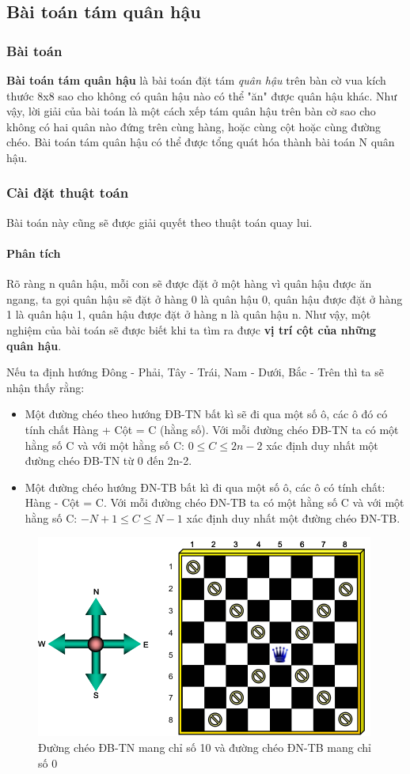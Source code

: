 \documentclass[a4paper,12pt]{report}
\begin{document}
\subsection{Bài toán tám quân hậu}

\subsubsection{Bài toán}
\textbf{Bài toán tám quân hậu} là bài toán đặt tám \emph{quân hậu} trên bàn cờ vua kích thước 8x8 sao cho không có quân hậu nào có thể "ăn" được quân hậu khác. Như vậy, lời giải của bài toán là một cách xếp tám quân hậu trên bàn cờ sao cho không có hai quân nào đứng trên cùng hàng, hoặc cùng cột hoặc cùng đường chéo. Bài toán tám quân hậu có thể được tổng quát hóa thành bài toán N quân hậu.

\subsubsection{Cài đặt thuật toán}
Bài toán này cũng sẽ được giải quyết theo thuật toán quay lui. 


\paragraph{Phân tích}
Rõ ràng n quân hậu, mỗi con sẽ được đặt ở một hàng vì quân hậu được ăn ngang, ta gọi quân hậu sẽ đặt ở hàng 0 là quân hậu 0, quân hậu được đặt ở hàng 1 là quân hậu 1, quân hậu được đặt ở hàng n là quân hậu n. Như vậy, một nghiệm của bài toán sẽ được biết khi ta tìm ra được \textbf{vị trí cột của những quân hậu}.

Nếu ta định hướng Đông - Phải, Tây - Trái, Nam - Dưới, Bắc - Trên thì ta sẽ nhận thấy rằng:
\begin{itemize}
\item Một đường chéo theo hướng ĐB-TN bất kì sẽ đi qua một số ô, các ô đó có tính chất Hàng + Cột = C (hằng số). Với mỗi đường chéo ĐB-TN ta có một hằng số C và với một hằng số C: $0 \le C \le 2n-2$ xác định duy nhất một đường chéo ĐB-TN từ 0 đến 2n-2.
\item Một đường chéo hướng ĐN-TB bất kì đi qua một số ô, các ô có tính chất: Hàng - Cột = C. Với mỗi đường chéo ĐN-TB ta có một hằng số C và với một hằng số C: $-N+1 \le C \le N-1$ xác định duy nhất một đường chéo ĐN-TB.
\end{itemize}
\begin{figure}[htp]
\centering
\includegraphics[scale=0.5]{img/quanhau.png}
\caption{Đường chéo ĐB-TN mang chỉ số 10 và đường chéo ĐN-TB mang chỉ số 0}
\label{}
\end{figure}
\end{document}
